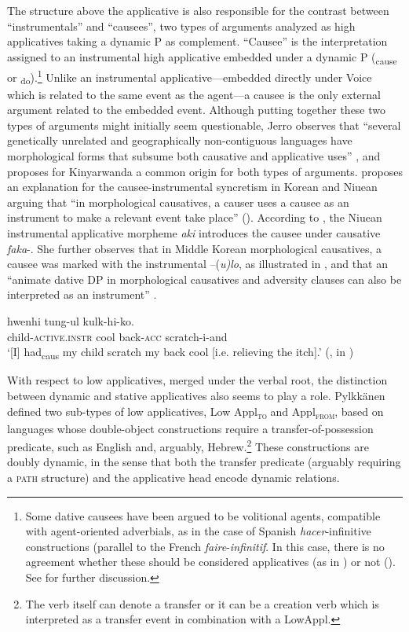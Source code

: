 \documentclass[output=paper,colorlinks,citecolor=brown,nonflat]{./langscibook}
\begin{document}
The structure above the applicative is also responsible for the contrast between “instrumentals” and “causees”, two types of arguments analyzed as high applicatives taking a dynamic \liv P as complement. “Causee” is the interpretation assigned to an instrumental high applicative embedded under a dynamic \liv P (\liv\textsubscript{cause}  or \liv \textsubscript{do}).\footnote{Some dative causees have been argued to be volitional agents, compatible with agent-oriented adverbials, as in the case of Spanish \textit{hacer}-infinitive constructions (parallel to the French \textit{faire}-\textit{infinitif}. In this case, there is no agreement whether these should be considered applicatives (as in \citealt{Torrego2011}) or not (\citealt{Kim2011high, Tubino2012}). See  for further discussion.} Unlike an instrumental applicative—embedded directly under Voice which is related to the same event as the agent—a causee is the only external argument related to the embedded event. Although putting together these two types of arguments might initially seem questionable, Jerro observes that “several genetically unrelated and geographically non-contiguous languages have morphological forms that subsume both causative and applicative uses” \citep[752]{Jerro2017}, and proposes for Kinyarwanda a common origin for both types of arguments.  \citet{Kim2011high} proposes an explanation for the causee-instrumental syncretism in Korean and Niuean arguing that “in morphological causatives, a causer uses a causee as an instrument to make a relevant event take place” (\citeyear[499]{Kim2011high}). According to \citeauthor{Kim2011high}, the Niuean instrumental applicative morpheme \textit{aki} introduces the causee under causative \textit{faka}-. She further observes that in Middle Korean morphological causatives, a causee was marked with the instrumental –(\textit{u)lo}, as illustrated in , and that an “animate dative DP in morphological causatives and adversity clauses can also be interpreted as an instrument” \citep[499]{Kim2011high}. 

\ea%
    \label{ex:cuervo:5}
     {hwenhi} {tung-ul} {kulk-hi-ko}.\\
    child\textsc{-active.instr} cool back\textsc{-acc} scratch-i-and\\
    \glt ‘[I] had\textsubscript{caus} my child scratch my back cool [i.e. relieving the   itch].’  (\citealt{Park1994}, in \citealt[499]{Kim2011high})
    \z

With respect to low applicatives, merged under the verbal root, the distinction between dynamic and stative applicatives also seems to play a role. Pylkkänen defined two sub-types of low applicatives, Low Appl\textsc{\textsubscript{to}}\textsubscript{} and Appl\textsc{\textsubscript{from}}, based on languages whose double-object constructions require a transfer-of-possession predicate, such as English and, arguably, Hebrew.\footnote{The verb itself can denote a transfer or it can be a creation verb which is interpreted as a transfer event in combination with a LowAppl.} These constructions are doubly dynamic, in the sense that both the transfer predicate (arguably requiring a \textsc{path} structure) and the applicative head encode dynamic relations.  
\end{document}
